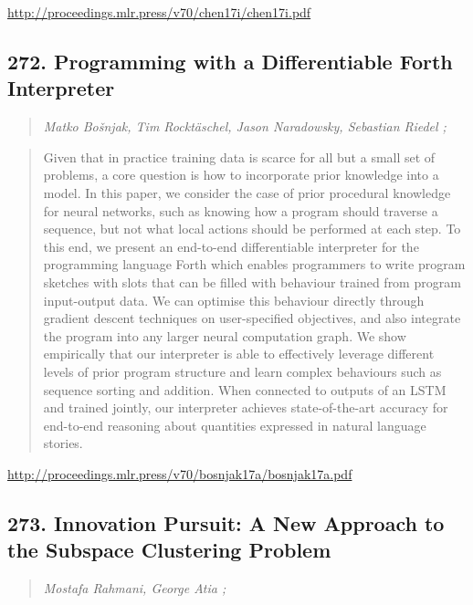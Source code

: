 \documentclass{article}
\begin{document}
\href{http://proceedings.mlr.press/v70/chen17i/chen17i.pdf}{http://proceedings.mlr.press/v70/chen17i/chen17i.pdf}

\subsection{272. Programming with a Differentiable Forth Interpreter}

\begin{quote}
\footnotesize{\textit{Matko Bošnjak, Tim Rocktäschel, Jason Naradowsky, Sebastian Riedel ;}}

\end{quote}

\begin{quote}
    Given that in practice training data is scarce for all but a small set of problems, a core question is how to incorporate prior knowledge into a model. In this paper, we consider the case of prior procedural knowledge for neural networks, such as knowing how a program should traverse a sequence, but not what local actions should be performed at each step. To this end, we present an end-to-end differentiable interpreter for the programming language Forth which enables programmers to write program sketches with slots that can be filled with behaviour trained from program input-output data. We can optimise this behaviour directly through gradient descent techniques on user-specified objectives, and also integrate the program into any larger neural computation graph. We show empirically that our interpreter is able to effectively leverage different levels of prior program structure and learn complex behaviours such as sequence sorting and addition. When connected to outputs of an LSTM and trained jointly, our interpreter achieves state-of-the-art accuracy for end-to-end reasoning about quantities expressed in natural language stories.  
\end{quote}

\href{http://proceedings.mlr.press/v70/bosnjak17a/bosnjak17a.pdf}{http://proceedings.mlr.press/v70/bosnjak17a/bosnjak17a.pdf}

\subsection{273. Innovation Pursuit: A New Approach to the Subspace Clustering Problem}

\begin{quote}
\footnotesize{\textit{Mostafa Rahmani, George Atia ;}}

\end{quote}
\end{document}
